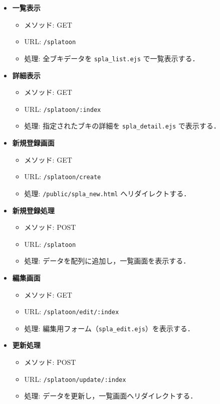 \documentclass[uplatex,dvipdfmx]{jsarticle}
\begin{document}
\begin{itemize}
    \item \textbf{一覧表示}
    \begin{itemize}
        \item メソッド: GET
        \item URL: \texttt{/splatoon}
        \item 処理: 全ブキデータを \texttt{spla\_list.ejs} で一覧表示する．
    \end{itemize}

    \item \textbf{詳細表示}
    \begin{itemize}
        \item メソッド: GET
        \item URL: \texttt{/splatoon/:index}
        \item 処理: 指定されたブキの詳細を \texttt{spla\_detail.ejs} で表示する．
    \end{itemize}
    
    \item \textbf{新規登録画面}
    \begin{itemize}
        \item メソッド: GET
        \item URL: \texttt{/splatoon/create}
        \item 処理: \texttt{/public/spla\_new.html} へリダイレクトする．
    \end{itemize}

    \item \textbf{新規登録処理}
    \begin{itemize}
        \item メソッド: POST
        \item URL: \texttt{/splatoon}
        \item 処理: データを配列に追加し，一覧画面を表示する．
    \end{itemize}

    \item \textbf{編集画面}
    \begin{itemize}
        \item メソッド: GET
        \item URL: \texttt{/splatoon/edit/:index}
        \item 処理: 編集用フォーム（\texttt{spla\_edit.ejs}）を表示する．
    \end{itemize}

    \item \textbf{更新処理}
    \begin{itemize}
        \item メソッド: POST
        \item URL: \texttt{/splatoon/update/:index}
        \item 処理: データを更新し，一覧画面へリダイレクトする．
    \end{itemize}


\end{itemize}
\end{document}
